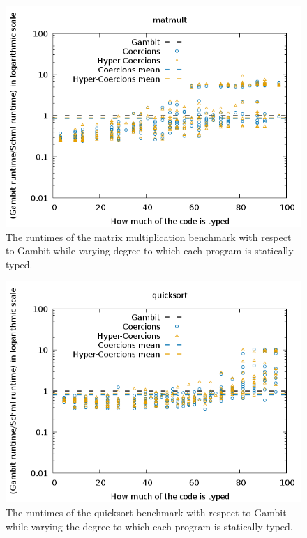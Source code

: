 \documentclass[acmtog, authorversion, acmlarge]{acmart}
\begin{document}
\begin{figure}
  \includegraphics[scale=.45]{matmult_Proxied.png}
  \caption{The runtimes of the matrix multiplication benchmark
    with respect to Gambit while varying degree to which each
    program is statically typed.}
  \label{fig:grd_matmult}
\end{figure}

\begin{figure}
  \includegraphics[scale=.5]{quicksort_Proxied.png}
  \caption{The runtimes of the quicksort benchmark with respect
    to Gambit while varying the degree to which each program
    is statically typed.}
  \label{fig:grd_quicksort}
\end{figure}
\end{document}

